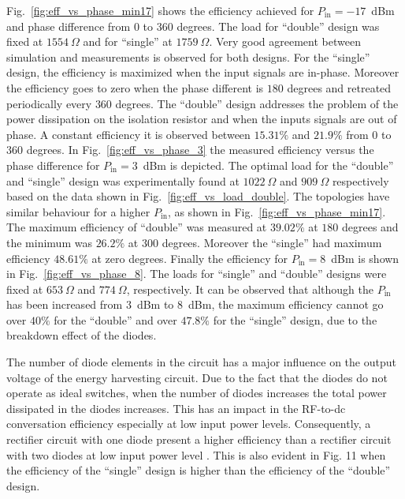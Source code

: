 \documentclass[journal]{IEEEtran}
\begin{document}
Fig.~\ref{fig:eff_vs_phase_min17} shows the
efficiency achieved  for  $P_\text{in}=-17$~dBm and  phase difference from $0$ to $360$ degrees.
%
The load for ``double'' design was fixed at $1554~\Omega$ and for ``single'' at  $1759~\Omega$.
%
Very good agreement between simulation and measurements is
observed for both  designs. 
%
For the ``single''  design, the efficiency is maximized when the input signals are in-phase.
%
Moreover the efficiency goes to zero when the phase different is $180$ degrees and retreated periodically every $360$ degrees.
%
The ``double'' design addresses the problem  of the power dissipation on the isolation resistor and when the inputs signals are out of phase.
%
A constant efficiency it is observed between $15.31 \%$ and $21.9 \%$ from $0$ to $360$ degrees.
%
%
In  Fig.~\ref{fig:eff_vs_phase_3} the measured efficiency versus the phase difference for $P_\text{in}=3$~dBm  is depicted.
%
The optimal load for the ``double''  and ``single'' design was experimentally found at  $1022~\Omega$ and $909~\Omega$ respectively   based on the data shown in  Fig.~\ref{fig:eff_vs_load_double}.
%
The  topologies 
have similar behaviour for a  higher  $P_\text{in}$, as shown in  Fig.~\ref{fig:eff_vs_phase_min17}.   
%
The maximum efficiency of  ``double'' was measured at $39.02\%$ at $180$ degrees and the minimum  was $26.2\%$ at $300$ degrees.
%
Moreover the  ``single'' had maximum efficiency $48.61\%$ at zero degrees. 
%
Finally  the efficiency  for   $P_\text{in}=8$~dBm
is shown in Fig.~\ref{fig:eff_vs_phase_8}. 
%
The loads for   ``single''  and ``double'' designs were fixed at  $653~\Omega$ and  $774~\Omega$, respectively.
%
It can be observed that although the $P_\text{in}$ has been increased from $3$~dBm to $8$~dBm, the maximum efficiency cannot go over  $40\%$ for the ``double'' and over $47.8\%$ for the  ``single'' design, due to the breakdown  effect of the diodes. 
%


The number of diode elements in the circuit has a major influence on the output voltage of the energy harvesting circuit. 
%
Due to the fact that the diodes do not operate as ideal switches, when the number of diodes increases the total power dissipated in the diodes increases. 
%
This has an impact in the RF-to-dc conversation efficiency especially at low input power levels. Consequently, a rectifier circuit with one diode present a higher efficiency than a rectifier circuit with two diodes at low input power level \cite{nintanavongsa2012design}. 
%
This is also evident in Fig. 11 when the efficiency of the ``single'' design is higher than the efficiency of the ``double'' design.
\end{document}

